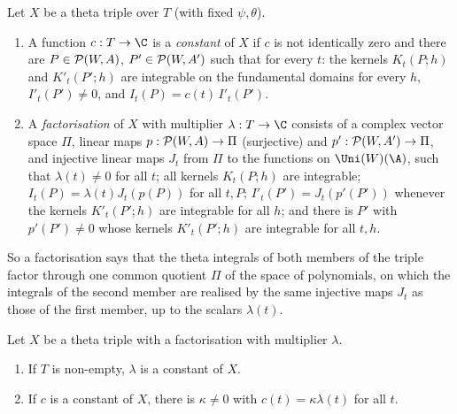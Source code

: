 \begin{definition}\label{pf:sh-theta:const}
Let $X$ be a theta triple over $T$ (with fixed $\psi,\theta$).
\begin{enumerate}[label=(\alph*)]
\item A function $c:T\to\C$ is a \emph{constant} of $X$ if $c$ is not identically zero and there are
$P\in\mathcal{P}(W,A)$, $P'\in\mathcal{P}(W,A')$ such that for every $t$: the kernels $K_t(P;h)$ and $K'_t(P';h)$ are
integrable on the fundamental domains for every $h$, $I'_t(P')\ne0$, and $I_t(P)=c(t)\,I'_t(P')$.
\item A \emph{factorisation} of $X$ with multiplier $\lambda:T\to\C$ consists of a complex vector space $\Pi$, linear maps
$p:\mathcal{P}(W,A)\to\Pi$ (surjective) and $p':\mathcal{P}(W,A')\to\Pi$, and injective linear maps $J_t$ from $\Pi$ to
the functions on $\Uni(W)(\A)$, such that $\lambda(t)\ne0$ for all $t$; all kernels $K_t(P;h)$ are integrable;
$I_t(P)=\lambda(t)J_t(p(P))$ for all $t,P$; $I'_t(P')=J_t(p'(P'))$ whenever the kernels $K'_t(P';h)$ are integrable for all
$h$; and there is $P'$ with $p'(P')\ne0$ whose kernels $K'_t(P';h)$ are integrable for all $t,h$.
\end{enumerate}
\end{definition}

So a factorisation says that the theta integrals of both members of the triple factor through one common quotient
$\Pi$ of the space of polynomials, on which the integrals of the second member are realised by the same injective maps
$J_t$ as those of the first member, up to the scalars $\lambda(t)$.

\begin{lemma}\label{pf:sh-theta:factor}
Let $X$ be a theta triple with a factorisation with multiplier $\lambda$.
\begin{enumerate}[label=(\alph*)]
\item If $T$ is non-empty, $\lambda$ is a constant of $X$.
\item If $c$ is a constant of $X$, there is $\kappa\ne0$ with $c(t)=\kappa\lambda(t)$ for all $t$.
\end{enumerate}
\end{lemma}

